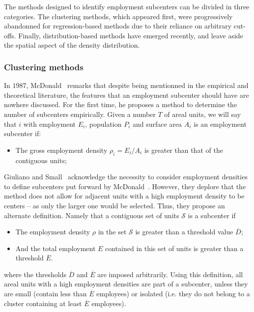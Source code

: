 The methods designed to identify employment subcenters can be divided in three
categories. The clustering methods, which appeared first, were progressively
abandonned for regression-based methods due to their reliance on arbitrary
cut-offs. Finally, distribution-based methods have emerged recently, and leave
aside the spatial aspect of the density distribution.


\subsubsection{Clustering methods}
\label{ssub:clustering_methods}


In $1987$, McDonald~\cite{McDonald:1987} remarks that despite being mentionned
in the empirical and theoretical literature, the features that an employment
subcenter should have are nowhere discussed. For the first time, he proposes a method to
determine the number of subcenters empirically. Given
a number $T$ of areal units, we will say that $i$ with employment $E_i$,
population $P_i$ and surface area $A_i$ is an employment subcenter if:

\begin{itemize}
    \item The gross employment density $\rho_i = E_i/A_i$ is greater than that
        of the contiguous units;
\end{itemize}

Giuliano and Small~\cite{Giuliano:1991} acknowledge the necessity to
consider employment densities to define subcenters put forward by
McDonald~\cite{McDonald:1987}. However, they deplore that the method does not
allow for adjacent units with a high employment density to be centers -- as only
the larger one would be selected. Thus, they propose an alternate definition.
Namely that a contiguous set of units $\mathcal{S}$ is a subcenter if 

\begin{itemize}
    \item The employment density $\rho$ in the set $\mathcal{S}$ is greater than
        a threshold value  $\overline{D}$;
    \item And the total employment $E$ contained in this set of units is greater than a threshold
        $\overline{E}$.
\end{itemize}

where the thresholds $\overline{D}$ and $\overline{E}$ are imposed arbitrarily.
Using this definition, all areal units with a high employment densities are part
of a subcenter, unless they are small (contain less than $\overline{E}$
employees) or isolated (i.e. they do not belong to a cluster containing at
least $\overline{E}$ employees).\\


